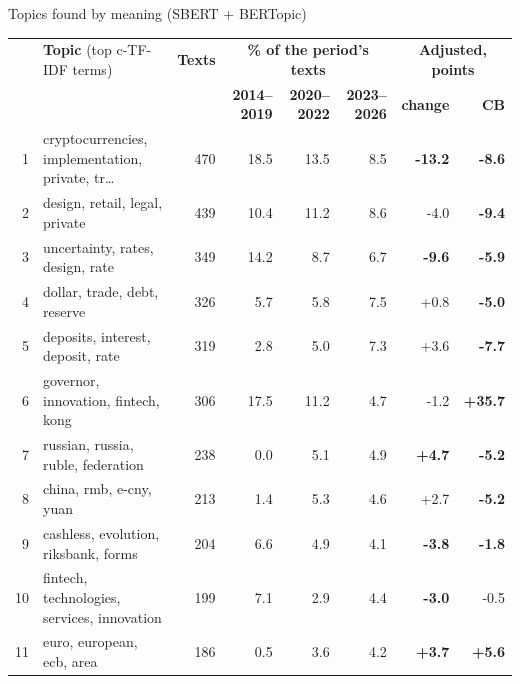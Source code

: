 \documentclass[aspectratio=169,10pt]{beamer}
\begin{document}
\begin{frame}{Topics found by meaning (SBERT + BERTopic)}
\scriptsize
\setlength{\tabcolsep}{4pt}
\begin{tabular}{@{}rp{}rrrrrr@{}}\toprule
 & \textbf{Topic} (top c-TF-IDF terms) & \textbf{Texts} & \multicolumn{3}{c}{\textbf{\% of the period's texts}} & \multicolumn{2}{c}{\textbf{Adjusted, points}}\\
 & & & \textbf{2014--2019} & \textbf{2020--2022} & \textbf{2023--2026} & \textbf{change} & \textbf{CB}\\\midrule
1 & cryptocurrencies, implementation, private, tr\dots{} & 470 & \cellcolor{c1!55}18.5 & \cellcolor{c1!40}13.5 & \cellcolor{c1!25}8.5 & \textbf{-13.2} & \textbf{-8.6} \\
2 & design, retail, legal, private & 439 & \cellcolor{c1!31}10.4 & \cellcolor{c1!33}11.2 & \cellcolor{c1!25}8.6 & {-4.0} & \textbf{-9.4} \\
3 & uncertainty, rates, design, rate & 349 & \cellcolor{c1!42}14.2 & \cellcolor{c1!26}8.7 & \cellcolor{c1!20}6.7 & \textbf{-9.6} & \textbf{-5.9} \\
4 & dollar, trade, debt, reserve & 326 & \cellcolor{c1!17}5.7 & \cellcolor{c1!17}5.8 & \cellcolor{c1!22}7.5 & {+0.8} & \textbf{-5.0} \\
5 & deposits, interest, deposit, rate & 319 & \cellcolor{c1!8}2.8 & \cellcolor{c1!15}5.0 & \cellcolor{c1!21}7.3 & {+3.6} & \textbf{-7.7} \\
6 & governor, innovation, fintech, kong & 306 & \cellcolor{c1!52}17.5 & \cellcolor{c1!33}11.2 & \cellcolor{c1!14}4.7 & {-1.2} & \textbf{+35.7} \\
7 & russian, russia, ruble, federation & 238 & \cellcolor{c1!0}0.0 & \cellcolor{c1!15}5.1 & \cellcolor{c1!14}4.9 & \textbf{+4.7} & \textbf{-5.2} \\
8 & china, rmb, e-cny, yuan & 213 & \cellcolor{c1!4}1.4 & \cellcolor{c1!16}5.3 & \cellcolor{c1!13}4.6 & {+2.7} & \textbf{-5.2} \\
9 & cashless, evolution, riksbank, forms & 204 & \cellcolor{c1!19}6.6 & \cellcolor{c1!14}4.9 & \cellcolor{c1!12}4.1 & \textbf{-3.8} & \textbf{-1.8} \\
10 & fintech, technologies, services, innovation & 199 & \cellcolor{c1!21}7.1 & \cellcolor{c1!8}2.9 & \cellcolor{c1!13}4.4 & \textbf{-3.0} & {-0.5} \\
11 & euro, european, ecb, area & 186 & \cellcolor{c1!1}0.5 & \cellcolor{c1!10}3.6 & \cellcolor{c1!12}4.2 & \textbf{+3.7} & \textbf{+5.6} \\

\end{tabular}
\end{frame}
\end{document}
